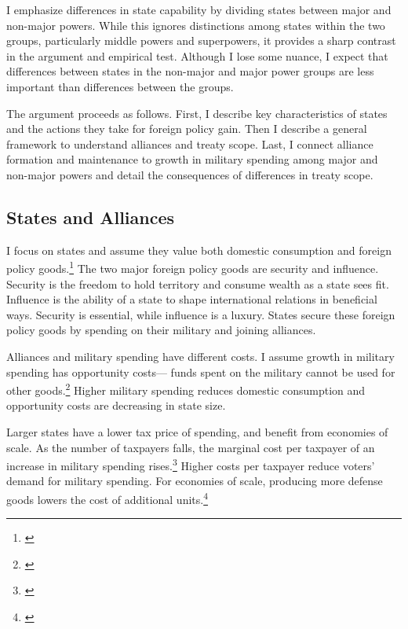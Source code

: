 \documentclass[12pt]{article}
\begin{document}
I emphasize differences in state capability by dividing states between major and non-major powers. 
While this ignores distinctions among states within the two groups, particularly middle powers and superpowers, it provides a sharp contrast in the argument and empirical test.
Although I lose some nuance, I expect that differences between states in the non-major and major power groups are less important than differences between the groups. 


The argument proceeds as follows.
First, I describe key characteristics of states and the actions they take for foreign policy gain. 
Then I describe a general framework to understand alliances and treaty scope. 
Last, I connect alliance formation and maintenance to growth in military spending among major and non-major powers and detail the consequences of differences in treaty scope.  



\subsection{States and Alliances}


I focus on states and assume they value both domestic consumption and foreign policy goods.\footnote{\cite{Powell1993, Fearon2018}}
The two major foreign policy goods are security and influence. 
Security is the freedom to hold territory and consume wealth as a state sees fit. 
Influence is the ability of a state to shape international relations in beneficial ways. 
Security is essential, while influence is a luxury. 
States secure these foreign policy goods by spending on their military and joining alliances. 


Alliances and military spending have different costs. 
I assume growth in military spending has opportunity costs--- funds spent on the military cannot be used for other goods.\footnote{\cite{Fearon2018}} 
Higher military spending reduces domestic consumption and opportunity costs are decreasing in state size. 


Larger states have a lower tax price of spending, and benefit from economies of scale. 
As the number of taxpayers falls, the marginal cost per taxpayer of an increase in military spending rises.\footnote{\cite{DudleyMontmarquette1981}}
Higher costs per taxpayer reduce voters' demand for military spending. 
For economies of scale, producing more defense goods lowers the cost of additional units.\footnote{\cite{Moravcsik1991, AlesinaSpolaore2006}}
\end{document}
